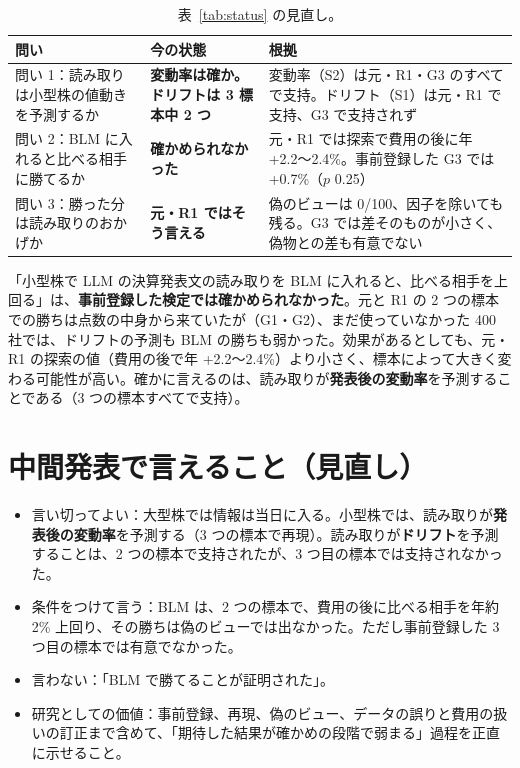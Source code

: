 \documentclass[xelatex,ja=standard,jafont=haranoaji,a4paper,10pt]{bxjsreport}
\newcommand{\tabref}[1]{表~\ref{#1}}
\begin{document}
\begin{longtable}{p{4.6cm}p{3.0cm}p{6.4cm}}
\caption{\tabref{tab:status} の見直し。}\label{tab:status2}\\
\toprule
\textbf{問い} & \textbf{今の状態} & \textbf{根拠} \\
\midrule
\endfirsthead
\bottomrule
\endfoot
問い 1：読み取りは小型株の値動きを予測するか & \textbf{変動率は確か。ドリフトは 3 標本中 2 つ} & 変動率（S2）は元・R1・G3 のすべてで支持。ドリフト（S1）は元・R1 で支持、G3 で支持されず \\
問い 2：BLM に入れると比べる相手に勝てるか & \textbf{確かめられなかった} & 元・R1 では探索で費用の後に年 +2.2〜2.4\%。事前登録した G3 では +0.7\%（$p$ 0.25） \\
問い 3：勝った分は読み取りのおかげか & \textbf{元・R1 ではそう言える} & 偽のビューは 0/100、因子を除いても残る。G3 では差そのものが小さく、偽物との差も有意でない \\
\end{longtable}

\begin{keybox}[証明の結果]
「小型株で LLM の決算発表文の読み取りを BLM に入れると、比べる相手を上回る」は、\textbf{事前登録した検定では確かめられなかった}。元と R1 の 2 つの標本での勝ちは点数の中身から来ていたが（G1・G2）、まだ使っていなかった 400 社では、ドリフトの予測も BLM の勝ちも弱かった。効果があるとしても、元・R1 の探索の値（費用の後で年 +2.2〜2.4\%）より小さく、標本によって大きく変わる可能性が高い。確かに言えるのは、読み取りが\textbf{発表後の変動率}を予測することである（3 つの標本すべてで支持）。
\end{keybox}

\section{中間発表で言えること（見直し）}

\begin{itemize}
\item 言い切ってよい：大型株では情報は当日に入る。小型株では、読み取りが\textbf{発表後の変動率}を予測する（3 つの標本で再現）。読み取りが\textbf{ドリフト}を予測することは、2 つの標本で支持されたが、3 つ目の標本では支持されなかった。
\item 条件をつけて言う：BLM は、2 つの標本で、費用の後に比べる相手を年約 2\% 上回り、その勝ちは偽のビューでは出なかった。ただし事前登録した 3 つ目の標本では有意でなかった。
\item 言わない：「BLM で勝てることが証明された」。
\item 研究としての価値：事前登録、再現、偽のビュー、データの誤りと費用の扱いの訂正まで含めて、「期待した結果が確かめの段階で弱まる」過程を正直に示せること。
\end{itemize}
\end{document}
